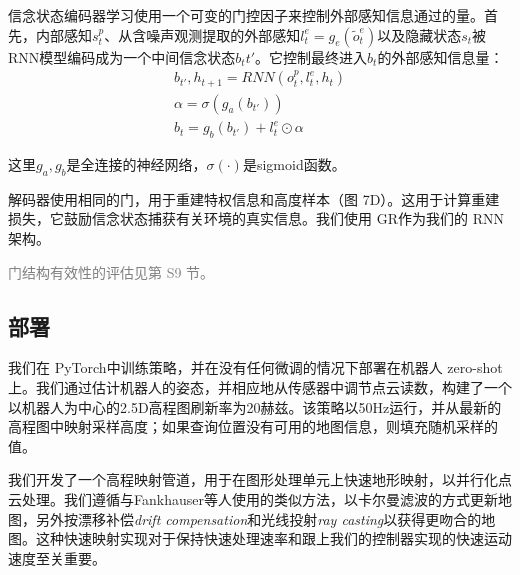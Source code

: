 信念状态编码器学习使用一个可变的门控因子来控制外部感知信息通过的量。首先，内部感知$s_t^p$、从含噪声观测提取的外部感知$l_t^e=g_e(\widetilde o_t^e)$以及隐藏状态$s_t$被RNN模型编码成为一个中间信念状态$b_t{t'}$。它控制最终进入$b_t$的外部感知信息量：
\begin{align}
  b_{t'},h_{t+1}=RNN(o_t^p,l_t^e,h_t)\\
  \alpha = \sigma (g_a(b_{t'}))\\
  b_t = g_b(b_{t'})+l_t^e \odot \alpha
\end{align}

这里$g_a,g_b$是全连接的神经网络，$\sigma(\cdot)$是sigmoid函数。

解码器使用相同的门，用于重建特权信息和高度样本（图 7D）。这用于计算重建损失，它鼓励信念状态捕获有关环境的真实信息。我们使用 GR\cite[p]{Cho_van_Merrienboer_Gulcehre_Bahdanau_Bougares_Schwenk_Bengio_2014}作为我们的 RNN 架构。

\textcolor{gray}{门结构有效性的评估见第 S9 节。}

\subsection[部署]{部署}

我们在 PyTorch\cite[p]{Paszke_Gross_Massa_Lerer_Bradbury_Chanan_Killeen_Lin_Gimelshein_Antiga_et_al_2019}中训练策略，并在没有任何微调的情况下部署在机器人 zero-shot上。我们通过估计机器人的姿态，并相应地从传感器中调节点云读数，构建了一个以机器人为中心的2.5D高程图刷新率为20赫兹。该策略以50Hz运行，并从最新的高程图中映射采样高度；如果查询位置没有可用的地图信息，则填充随机采样的值。

我们开发了一个高程映射管道，用于在图形处理单元上快速地形映射，以并行化点云处理。我们遵循与Fankhauser等人\cite[p]{Fankhauser_Bloesch_Hutter_2018}使用的类似方法，以卡尔曼滤波的方式更新地图，另外按漂移补偿\emph{drift compensation}和光线投射\emph{ray casting}以获得更吻合的地图。这种快速映射实现对于保持快速处理速率和跟上我们的控制器实现的快速运动速度至关重要。

